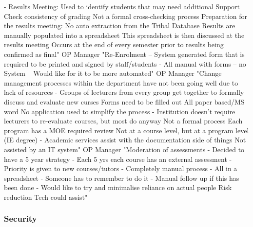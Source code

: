 - Results Meeting:
     Used to identify students that may need additional Support
     Check consistency of grading
     Not a formal cross-checking process
     Preparation for the results meeting:
       No auto extraction from the Tribal Database
       Results are manually populated into a spreadsheet
       This spreadsheet is then discussed at the results meeting
       Occurs at the end of every semester prior to results being confirmed as final"
OP Manager	"Re-Enrolment – System generated form that is required to be printed and signed by staff/students
- All manual with forms – no System
   Would like for it to be more automated"
OP Manager	"Change management processes within the department have not been going well due to lack of resources
  - Groups of lecturers from every group get together to formally discuss and evaluate new curses
      Forms need to be filled out
      All paper based/MS word
      No application used to simplify the process
  - Institution doesn’t require lecturers to re-evaluate courses, but most do anyway
      Not a formal process
      Each program has a MOE required review
      Not at a course level, but at a program level (IE degree)
  - Academic services assist with the documentation side of things
      Not assisted by an IT system"
OP Manager	"Moderation of assessments
  - Decided to have a 5 year strategy
  - Each 5 yrs each course has an external assessment
  - Priority is given to new courses/tutors
  - Completely manual process
  - All in a spreadsheet
  - Someone has to remember to do it
  - Manual follow up if this has been done
  - Would like to try and minimalise reliance on actual people 
      Risk reduction
      Tech could assist"




\subsubsection{Security} 

